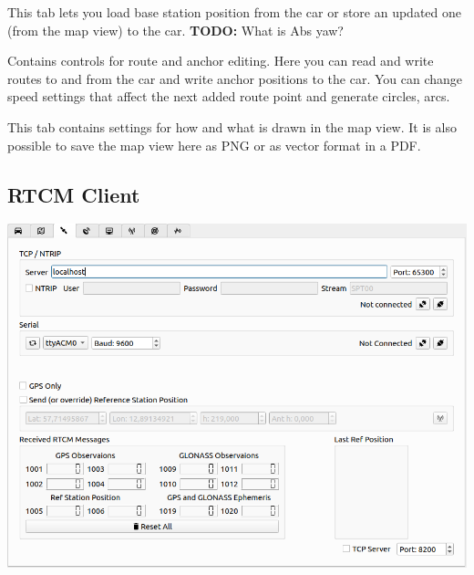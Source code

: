 \documentclass[12pt]{article} %
\newcommand{\todo}[1]{{\color{red} \textbf{TODO:} #1}}
\begin{document}
\vspace{5mm}

 This tab lets you load base station position from the car or
store an updated one (from the map view) to the car. \todo{What is Abs
  yaw?}

 Contains controls for route and anchor editing. Here
you can read and write routes to and from the car and write anchor
positions to the car.  You can change speed settings that affect the
next added route point and generate circles, arcs.


 This tab contains settings for how and what is drawn
in the map view.  It is also possible to save the map view here as PNG
or as vector format in a PDF.


\subsection{RTCM Client}

\noindent \includegraphics[width=\textwidth]{./screens/RTCM_client.png}
\end{document}
